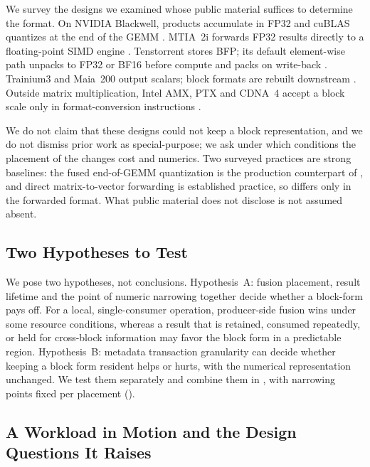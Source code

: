%
We survey the designs we examined whose public material suffices to determine the \handoff format.
On NVIDIA Blackwell, \blockscaled products accumulate in FP32 and cuBLAS quantizes at the end of the GEMM \cite{NVIDIA2026PTXISA94,nvidia_cublas_13_4}.
MTIA~2i forwards FP32 results directly to a floating-point SIMD engine \cite{Coburn2025MTIA2}.
Tenstorrent stores BFP; its default element-wise path unpacks to FP32 or BF16 before compute and packs on write-back \cite{tenstorrent_isa_wormhole,tenstorrent_metalium_dataflow}.
Trainium3 and Maia~200 output scalars; block formats are rebuilt downstream .
Outside matrix multiplication, Intel AMX, PTX and CDNA~4 accept a block scale only in format-conversion instructions \cite{NVIDIA2026PTXISA94,amd2025cdna4} .

%
We do not claim that these designs could not keep a block representation, and we do not dismiss prior work as special-purpose; we ask under which conditions the placement of the \handoff changes cost and numerics.
Two surveyed practices are strong baselines: the fused end-of-GEMM quantization is the production counterpart of \armSE, and direct matrix-to-vector forwarding is established practice, so \armBD differs only in the forwarded format.
What public material does not disclose is not assumed absent.

\subsection{Two Hypotheses to Test}\label{sec:bg-hypotheses}

%
We pose two hypotheses, not conclusions.
Hypothesis~A: fusion placement, result lifetime and the point of numeric narrowing together decide whether a block-form \handoff pays off. For a local, single-consumer operation, producer-side fusion wins under some resource conditions, whereas a result that is retained, consumed repeatedly, or held for cross-block information may favor the block form in a predictable region.
Hypothesis~B: metadata transaction granularity can decide whether keeping a block form resident helps or hurts, with the numerical representation unchanged.
We test them separately and combine them in , with narrowing points fixed per placement ().

\subsection{A Workload in Motion and the Design Questions It Raises}\label{sec:bg-workload}

